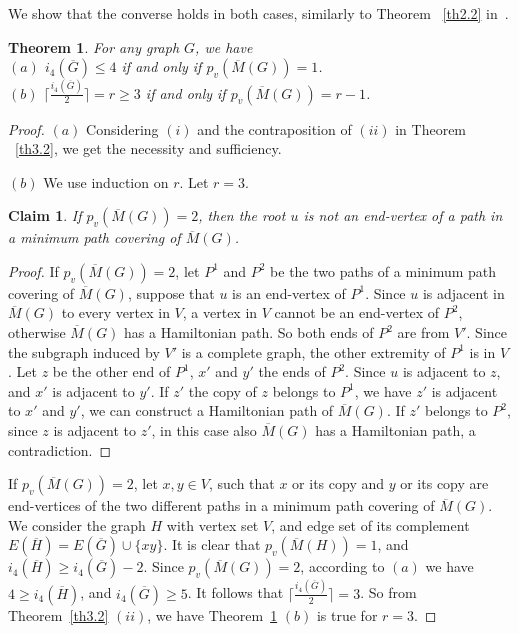 \documentclass{article}
\newtheorem{theorem} {Theorem}
\newtheorem{claim} {Claim}
\newtheorem{open problem} {Open Problem}
\numberwithin{lemma}{section}
\numberwithin{theorem}{section}
\numberwithin{cor}{section}
\numberwithin{prop}{section}
\numberwithin{con}{section}
\numberwithin{claim}{section}
\numberwithin{obs}{section}
\numberwithin{dnt}{section}
\begin{document}
We show that the converse holds in both cases, similarly to Theorem ~\ref{th2.2} in~\cite{george}.
\begin{theorem}\label{th3.3}
	For any graph $G$, we have\\
	$(a)$  $i_4(\overline{G})\leq 4$ if and only if $p_v(\overline{M}(G))=1$.\\
	$(b)$  $ \lceil \frac{i_4(\overline{G})}{2} \rceil=r\geq  3$ if and only if $p_v(\overline{M}(G))=r-1$.
\end{theorem}
\begin{proof}
	\par $(a)$ Considering $(i)$  and the contraposition of $(ii)$ in Theorem ~\ref{th3.2}, we get the necessity and sufficiency.
	\par $(b)$ We use induction on $r$. Let $r=3$.
	\begin{claim}
		If $p_v(\overline{M}(G))=2$, then the root $u$ is not an end-vertex of a path in a minimum path covering of $\overline{M}(G)$.   
	\end{claim}
	\begin{proof}
		If $p_v(\overline{M}(G))=2$, let $P^1$ and $P^2$ be the two paths of a minimum path covering of $\overline{M}(G)$, suppose that  $u$ is an end-vertex of $P^1$. Since $u$ is adjacent in $\overline{M}(G)$ to every vertex in $V$, a vertex in $V$ cannot be an end-vertex of $P^2$, otherwise $\overline{M}(G)$ has a Hamiltonian path. So both ends of $P^2$ are from $V'$. Since the subgraph induced by $V'$ is a complete graph, the other extremity of $P^1$ is in $V$. Let $z$ be the other end of $P^1$, $x'$ and $y'$ the ends of $P^2$. Since $u$ is adjacent to $z$, and $x'$ is adjacent to $y'$. If $z'$ the copy of $z$ belongs to $P^1$, we have $z'$ is adjacent to $x'$ and $y'$, we can construct a Hamiltonian path of $\overline{M}(G)$. If $z'$ belongs to $P^2$, since $z$ is adjacent to $z'$, in this case also $\overline{M}(G)$ has a Hamiltonian path, a contradiction.
	\end{proof}
	If $p_v(\overline{M}(G))=2$, let $x,y\in V$, such that $x$ or its copy and $y$ or its copy are end-vertices of the two different paths in a minimum path covering of $\overline{M}(G)$. We consider the graph $H$ with vertex set $V$, and edge set of its complement $E(\overline{H})=E(\overline{G})\cup\{xy\}$. It is clear that $p_v(\overline{M}(H))=1$, and $i_4(\overline{H})\geq i_4(\overline{G})-2$. Since $p_v(\overline{M}(G))=2$, according to $(a)$ we have $4\geq i_4(\overline{H})$, and $i_4(\overline{G})\geq 5$. It follows that $\lceil \frac{i_4(\overline{G})}{2} \rceil=3$. So from Theorem~\ref{th3.2} $(ii)$, we have Theorem~\ref{th3.3} $(b)$ is true for $r=3$.\par

\end{proof}
\end{document}
